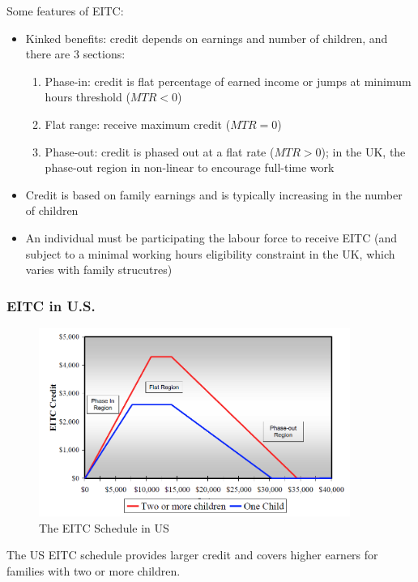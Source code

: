         Some features of EITC:
        \begin{itemize}
            \item Kinked benefits: credit depends on earnings and number of children, and there are 3 sections:
            \begin{enumerate}
                \item Phase-in: credit is flat percentage of earned income or jumps at minimum hours threshold ($MTR<0$)
                \item Flat range: receive maximum credit ($MTR=0$)
                \item Phase-out: credit is phased out at a flat rate ($MTR>0$); in the UK, the phase-out region in non-linear to encourage full-time work
            \end{enumerate}
            \item Credit is based on family earnings and is typically increasing in the number of children
            \item An individual must be participating the labour force to receive EITC (and subject to a minimal working hours eligibility constraint in the UK, which varies with family strucutres)
        \end{itemize}

        \subsubsection{EITC in U.S.}
        
            \begin{figure}[H]
                \centering
                \includegraphics[width=4in]{images/ch13/13_US_EITC_1.png}
                \caption{The EITC Schedule in US}
            \end{figure}
            The US EITC schedule provides larger credit and covers higher earners for families with two or more children.
    
